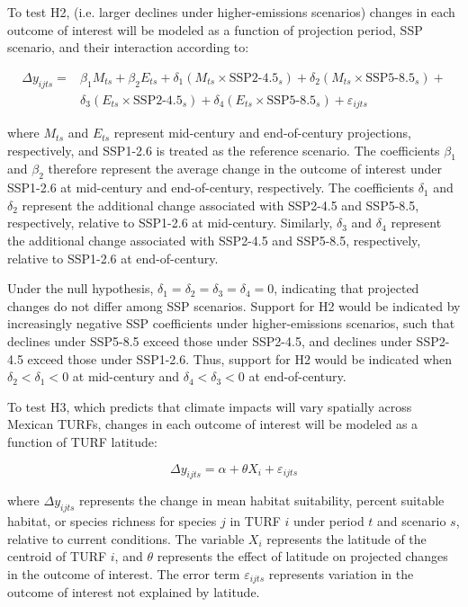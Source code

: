 \documentclass[12pt]{article}
\begin{document}
To test H2, (i.e. larger declines under higher-emissions scenarios) changes in each outcome of interest will be modeled as a function of projection period, SSP scenario, and their interaction according to:


\begin{equation}
\begin{split}
\Delta y_{ijts} =
&\beta_1 M_{ts} +
\beta_2 E_{ts} +
\delta_1 \left(M_{ts} \times \text{SSP2-4.5}_{s}\right) +
\delta_2 \left(M_{ts} \times \text{SSP5-8.5}_{s}\right) + \\
&\delta_3 \left(E_{ts} \times \text{SSP2-4.5}_{s}\right) +
\delta_4 \left(E_{ts} \times \text{SSP5-8.5}_{s}\right) +
\varepsilon_{ijts}
\end{split}
\label{eq:h2_regression}
\end{equation}

where $M_{ts}$ and $E_{ts}$ represent mid-century and end-of-century projections, respectively, and SSP1-2.6 is treated as the reference scenario. The coefficients $\beta_1$ and $\beta_2$ therefore represent the average change in the outcome of interest under SSP1-2.6 at mid-century and end-of-century, respectively. The coefficients $\delta_1$ and $\delta_2$ represent the additional change associated with SSP2-4.5 and SSP5-8.5, respectively, relative to SSP1-2.6 at mid-century. Similarly, $\delta_3$ and $\delta_4$ represent the additional change associated with SSP2-4.5 and SSP5-8.5, respectively, relative to SSP1-2.6 at end-of-century.

Under the null hypothesis, $\delta_1 = \delta_2 = \delta_3 = \delta_4 = 0$, indicating that projected changes do not differ among SSP scenarios. Support for H2 would be indicated by increasingly negative SSP coefficients under higher-emissions scenarios, such that declines under SSP5-8.5 exceed those under SSP2-4.5, and declines under SSP2-4.5 exceed those under SSP1-2.6. Thus, support for H2 would be indicated when $\delta_2 < \delta_1 < 0$ at mid-century and $\delta_4 < \delta_3 < 0$ at end-of-century.

To test H3, which predicts that climate impacts will vary spatially across Mexican TURFs, changes in each outcome of interest will be modeled as a function of TURF latitude:

\begin{equation}
\Delta y_{ijts} = \alpha + \theta X_i + \varepsilon_{ijts}
\label{eq:h3_regression}
\end{equation}

where $\Delta y_{ijts}$ represents the change in mean habitat suitability, percent suitable habitat, or species richness for species $j$ in TURF $i$ under period $t$ and scenario $s$, relative to current conditions. The variable $X_i$ represents the latitude of the centroid of TURF $i$, and $\theta$ represents the effect of latitude on projected changes in the outcome of interest. The error term $\varepsilon_{ijts}$ represents variation in the outcome of interest not explained by latitude.
\end{document}
